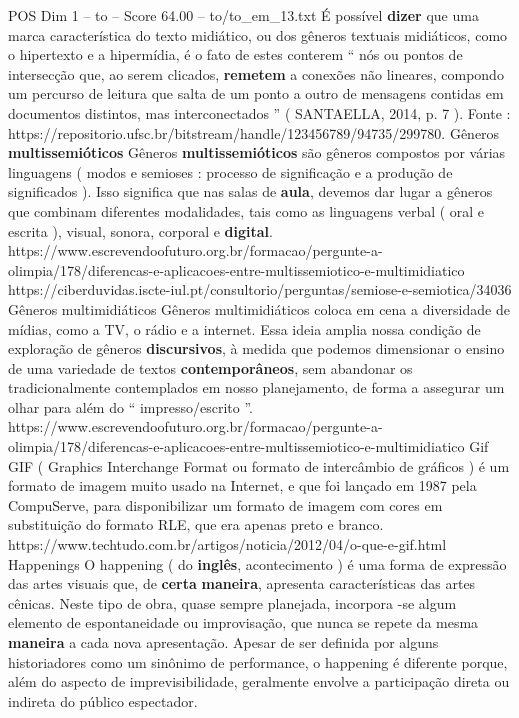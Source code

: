 \begin{textsample}{POS Dim 1 – to – Score 64.00 – to/to\_em\_13.txt}
É possível \textbf{dizer} que uma marca característica do texto midiático, ou dos gêneros textuais midiáticos, como o hipertexto e a hipermídia, é o fato de estes conterem “ nós ou pontos de intersecção que, ao serem clicados, \textbf{remetem} a conexões não lineares, compondo um percurso de leitura que salta de um ponto a outro de mensagens contidas em documentos distintos, mas interconectados ” ( SANTAELLA, 2014, p. 7 ).
Fonte : https://repositorio.ufsc.br/bitstream/handle/123456789/94735/299780.
Gêneros \textbf{multissemióticos} Gêneros \textbf{multissemióticos} são gêneros compostos por várias linguagens ( modos e semioses : processo de significação e a produção de significados ).
Isso significa que nas salas de \textbf{aula}, devemos dar lugar a gêneros que combinam diferentes modalidades, tais como as linguagens verbal ( oral e escrita ), visual, sonora, corporal e \textbf{digital}. https://www.escrevendoofuturo.org.br/formacao/pergunte-a-olimpia/178/diferencas-e-aplicacoes-entre-multissemiotico-e-multimidiatico https://ciberduvidas.iscte-iul.pt/consultorio/perguntas/semiose-e-semiotica/34036 Gêneros multimidiáticos Gêneros multimidiáticos coloca em cena a diversidade de mídias, como a TV, o rádio e a internet.
Essa ideia amplia nossa condição de exploração de gêneros \textbf{discursivos}, à medida que podemos dimensionar o ensino de uma variedade de textos \textbf{contemporâneos}, sem abandonar os tradicionalmente contemplados em nosso planejamento, de forma a assegurar um olhar para além do “ impresso/escrito ”. https://www.escrevendoofuturo.org.br/formacao/pergunte-a-olimpia/178/diferencas-e-aplicacoes-entre-multissemiotico-e-multimidiatico Gif GIF ( Graphics Interchange Format ou formato de intercâmbio de gráficos ) é um formato de imagem muito usado na Internet, e que foi lançado em 1987 pela CompuServe, para disponibilizar um formato de imagem com cores em substituição do formato RLE, que era apenas preto e branco. https://www.techtudo.com.br/artigos/noticia/2012/04/o-que-e-gif.html Happenings O happening ( do \textbf{inglês}, acontecimento ) é uma forma de expressão das artes visuais que, de \textbf{certa} \textbf{maneira}, apresenta características das artes cênicas.
Neste tipo de obra, quase sempre planejada, incorpora -se algum elemento de espontaneidade ou improvisação, que nunca se repete da mesma \textbf{maneira} a cada nova apresentação.
Apesar de ser definida por alguns historiadores como um sinônimo de performance, o happening é diferente porque, além do aspecto de imprevisibilidade, geralmente envolve a participação direta ou indireta do público espectador.

\end{textsample}
